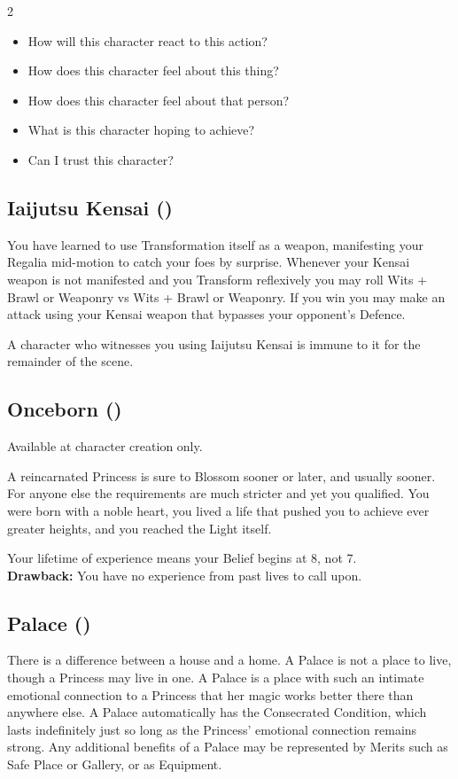 \begin{multicols}{2}
\begin{itemize}
 \item How will this character react to this action?
 \item How does this character feel about this thing?
 \item How does this character feel about that person?
 \item What is this character hoping to achieve? 
 \item Can I trust this character? 
\end{itemize}

\subsection*{Iaijutsu Kensai (\textbullet\textbullet)}

You have learned to use Transformation itself as a weapon, manifesting your Regalia mid-motion to catch your foes by surprise. Whenever your Kensai weapon is not manifested and you Transform reflexively you may roll Wits + Brawl or Weaponry vs Wits + Brawl or Weaponry. If you win you may make an attack using your Kensai weapon that bypasses your opponent's Defence. 

A character who witnesses you using Iaijutsu Kensai is immune to it for the remainder of the scene. 

\subsection*{Onceborn (\textbullet\textbullet)}

Available at character creation only.

A reincarnated Princess is sure to Blossom sooner or later, and usually sooner. For anyone else the requirements are much stricter and yet you qualified. You were born with a noble heart, you lived a life that pushed you to achieve ever greater heights, and you reached the Light itself. 

Your lifetime of experience means your Belief begins at 8, not 7.\\

\noindent\textbf{Drawback:} You have no experience from past lives to call upon. 

\subsection*{Palace (\textbullet)}

There is a difference between a house and a home. A Palace is not a place to live, though a Princess may live in one. A Palace is a place with such an intimate emotional connection to a Princess that her magic works better there than anywhere else. A Palace automatically has the Consecrated Condition, which lasts indefinitely just so long as the Princess' emotional connection remains strong. Any additional benefits of a Palace may be represented by Merits such as Safe Place or Gallery, or as Equipment. 


\end{multicols}
